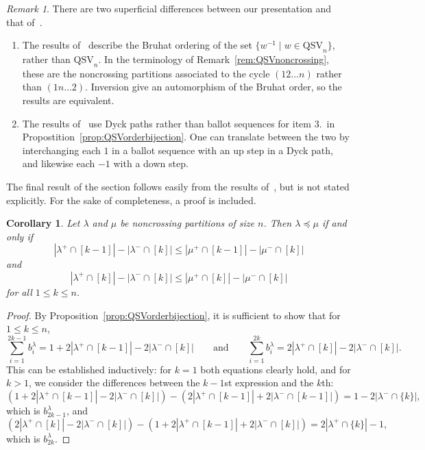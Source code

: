 \documentclass[12pt]{article}
\newtheorem{cor}[equation]{Corollary}
\theoremstyle{definition}
\theoremstyle{remark}
\newtheorem{rem}[equation]{Remark}
\numberwithin{equation}{section}
\newcommand{\QSV}{\mathrm{QSV}}
\begin{document}
\begin{rem}
There are two superficial differences between our presentation and that of~\cite{GobetWilliams}.
\begin{enumerate}
\item The results of~\cite{GobetWilliams} describe the Bruhat ordering of the set $\{w^{-1} \;|\; w \in \QSV_{n}\}$, rather than $\QSV_{n}$.  
In the terminology of Remark~\ref{rem:QSVnoncrossing}, these are the noncrossing partitions associated to the cycle $(12\ldots n)$ rather than $(1n\ldots 2)$.  
Inversion give an automorphism of the Bruhat order, so the results are equivalent.

\item The results of~\cite{GobetWilliams} use Dyck paths rather than ballot sequences for item 3.~in Propostition~\ref{prop:QSVorderbijection}.  
One can translate between the two by interchanging each $1$ in a ballot sequence with an up step in a Dyck path, and likewise each $-1$ with a down step.

\end{enumerate}
%
%
\end{rem}

The final result of the section follows easily from the results of~\cite{GobetWilliams}, but is not stated explicitly.  For the sake of completeness, a proof is included.

\begin{cor}
\label{cor:bruhatncphelper}
Let $\lambda$ and $\mu$ be noncrossing partitions of size $n$.  Then $\lambda \preceq \mu$ if and only if 
\[
|\lambda^{+} \cap [k-1]| - |\lambda^{-} \cap [k]| \le |\mu^{+} \cap [k-1]| - |\mu^{-} \cap [k]|
\]
and
\[
|\lambda^{+} \cap [k]| - |\lambda^{-} \cap [k]| \le |\mu^{+} \cap [k]| - |\mu^{-} \cap [k]| 
\]
for all $1 \le k \le n$.
\end{cor}
\begin{proof}
By Proposition~\ref{prop:QSVorderbijection}, it is sufficient to show that for $1 \le k \le n$,
\[
\sum_{i = 1}^{2k - 1} b^{\lambda}_{i}  = 1 + 2|\lambda^{+} \cap [k-1]| - 2|\lambda^{-} \cap [k]|
\qquad\text{and}\qquad
\sum_{i = 1}^{2k} b^{\lambda}_{i}  = 2|\lambda^{+} \cap [k]| - 2|\lambda^{-} \cap [k]|.
\] 
This can be established inductively: for $k = 1$ both equations clearly hold, and for $k > 1$, we consider the differences between the $k-1$st expression and the $k$th: 
\[
(1 + 2|\lambda^{+} \cap [k-1]| - 2|\lambda^{-} \cap [k]|) - (2|\lambda^{+} \cap [k-1]| + 2|\lambda^{-} \cap [k-1]|)
= 1 - 2|\lambda^{-} \cap \{k\}|,
\]
which is $b^{\lambda}_{2k-1}$, and 
\[
(2|\lambda^{+} \cap [k]| - 2|\lambda^{-} \cap [k]|) - (1 + 2|\lambda^{+} \cap [k-1]| + 2|\lambda^{-} \cap [k]|) = 2|\lambda^{+} \cap \{k\}| - 1,
\]
which is $b^{\lambda}_{2k}$.
\end{proof}
\end{document}
